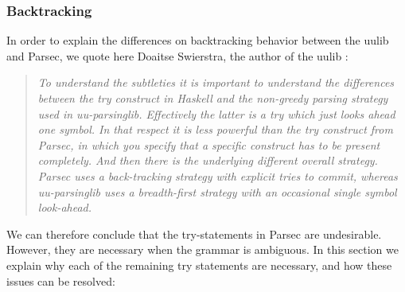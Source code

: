 \subsubsection{Backtracking}
\label{subsec:backtracking}
In order to explain the differences on backtracking behavior between the uulib and Parsec, we quote here Doaitse Swierstra, the author of the uulib :
\begin{quote}
\textsl{To understand the subtleties it is important to understand the differences between the try construct in Haskell and the non-greedy parsing strategy used in uu-parsinglib. Effectively the latter is a try which just looks ahead one symbol. In that respect it is less powerful than the try construct from Parsec, in which you specify that a specific construct has to be present completely. And then there is the underlying different overall strategy. Parsec uses a back-tracking strategy with explicit tries to commit, whereas uu-parsinglib uses a breadth-first strategy with an occasional single symbol look-ahead.}
\end{quote}
%
We can therefore conclude that the try-statements in Parsec are undesirable.
However, they are necessary when the grammar is ambiguous.
In this section we explain why each of the remaining try statements are necessary, and how these issues can be resolved:
